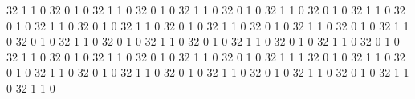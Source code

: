 32
1
1
0
32
0
1
0
32
1
1
0
32
0
1
0
32
1
1
0
32
0
1
0
32
1
1
0
32
0
1
0
32
1
1
0
32
0
1
0
32
1
1
0
32
0
1
0
32
1
1
0
32
0
1
0
32
1
1
0
32
0
1
0
32
1
1
0
32
0
1
0
32
1
1
0
32
0
1
0
32
1
1
0
32
0
1
0
32
1
1
0
32
0
1
0
32
1
1
0
32
0
1
0
32
1
1
0
32
0
1
0
32
1
1
0
32
0
1
0
32
1
1
0
32
0
1
0
32
1
1
0
32
0
1
0
32
1
1
1
32
0
1
0
32
1
1
0
32
0
1
0
32
1
1
0
32
0
1
0
32
1
1
0
32
0
1
0
32
1
1
0
32
0
1
0
32
1
1
0
32
0
1
0
32
1
1
0
32
1
1
0
